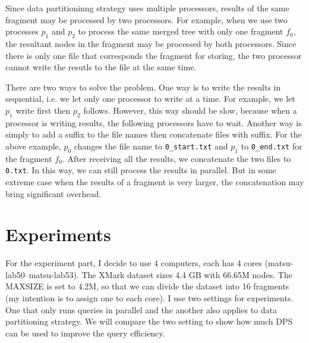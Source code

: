 Since data partitioninng strategy uses multiple processors, results of the same
fragment may be processed by two processors. For example, when we use two
processes $p_1$ and $p_2$ to process the same merged tree with only one fragment
$f_0$, the resultant nodes in the fragment may be processed by both processors.
Since there is only one file that corresponds the fragment for storing, the two
processor cannot write the resutls to the file at the same time.

There are two ways to solve the problem. One way is to write the results in
sequential, i.e. we let only one processor to write at a time. For example, we
let $p_1$ write first then $p_2$ follows. However, this way should be slow, because
when a processor is writing results, the following processors have to wait.
Another way is simply to add a suffix to the file names then concatenate files
with suffix. For the above example, $p_0$ changes the file name to
\texttt{0\_start.txt} and $p_1$ to \texttt{0\_end.txt} for the fragment $f_0$.
After receiving all the results, we concatenate the two files to \texttt{0.txt}.
In this way, we can still process the results in parallel. But in some extreme
case when the results of a fragment is very larger, the concatenation may bring
significant overhead.



\section{Experiments}

For the experiment part, I decide to use 4 computers, each has 4 cores
(matsu-lab50--matsu-lab53). The XMark dataset sizes 4.4 GB with 66.65M nodes.
The MAXSIZE is set to 4.2M, so that we can divide the dataset into 16 fragments
(my intention is to assign one to each core). I use two settings for
experiments. One that only runs queries in parallel and the another also applies
to data partitioning strategy. We will compare the two setting to show how much
DPS can be used to improve the query efficiency.

